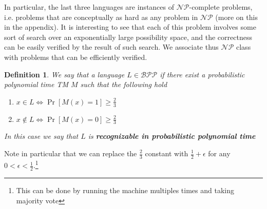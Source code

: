 \documentclass{article}
\newtheorem{definition}{Definition}
\begin{document}
In particular, the last three languages are instances of $\mathcal{NP}$-complete problems, i.e. problems that are conceptually as hard as any problem in $\mathcal{NP}$ (more on this in the appendix). It is interesting to see that each of this problem involves some sort of search over an exponentially large possibility space, and the correctness can be easily verified by the result of such search. We associate thus $\mathcal{NP}$ class with problems that can be efficiently verified.

\begin{definition}
We say that a language $L \in \mathcal{BPP}$ if there exist a probabilistic polynomial time TM $M$ such that the following hold
\begin{enumerate}
    \item $x \in L \iff \Pr[M(x) = 1] \geq \frac{2}{3}$
    \item $x \notin L \iff \Pr[M(x) = 0] \geq \frac{2}{3}$
\end{enumerate}
In this case we say that $L$ is \textbf{recognizable in probabilistic polynomial time}
\end{definition}

Note in particular that we can replace the $\frac{2}{3}$ constant with $\frac{1}{2} + \epsilon$ for any $0 < \epsilon < \frac{1}{2}.$\footnote{This can be done by running the machine multiples times and taking majority vote}
\end{document}
